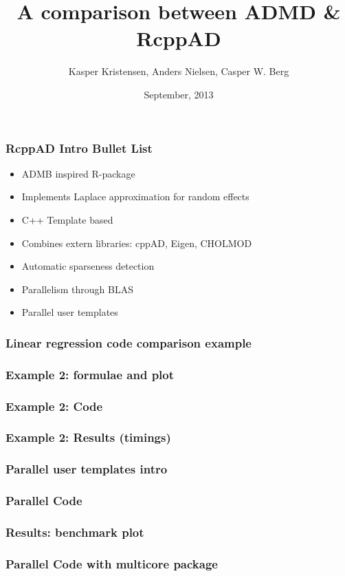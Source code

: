 \documentclass[compress]{beamer}
\title[RcppAD]
{A comparison between ADMD \& RcppAD}
\author[K. Kristensen, A. Nielsen, C.W. Berg ]%
{Kasper Kristensen, Anders Nielsen, Casper W. Berg}
\date[September 2013] %
{September, 2013}
\begin{document}
\begin{frame}[plain]
  \titlepage
\end{frame}

\begin{frame}
\frametitle{RcppAD Intro Bullet List}

\begin{itemize}
  \item ADMB inspired R-package
  \item Implements Laplace approximation for random effects
  \item C++ Template based
  \item Combines extern libraries: cppAD, Eigen, CHOLMOD
  \item Automatic sparseness detection
  \item Parallelism through BLAS
  \item Parallel user templates
\end{itemize}


\end{frame}

\begin{frame}
  \frametitle{Linear regression code comparison example}
\end{frame}


\begin{frame}
  \frametitle{Example 2: formulae and plot}
\end{frame}

\begin{frame}
  \frametitle{Example 2: Code}
\end{frame}

\begin{frame}
  \frametitle{Example 2: Results (timings)}
\end{frame}

\begin{frame}
  \frametitle{Parallel user templates intro}
\end{frame}

\begin{frame}
  \frametitle{Parallel Code}
\end{frame}

\begin{frame}
  \frametitle{Results: benchmark plot}
\end{frame}


\begin{frame}
  \frametitle{Parallel Code with multicore package}
\end{frame}
\end{document}
